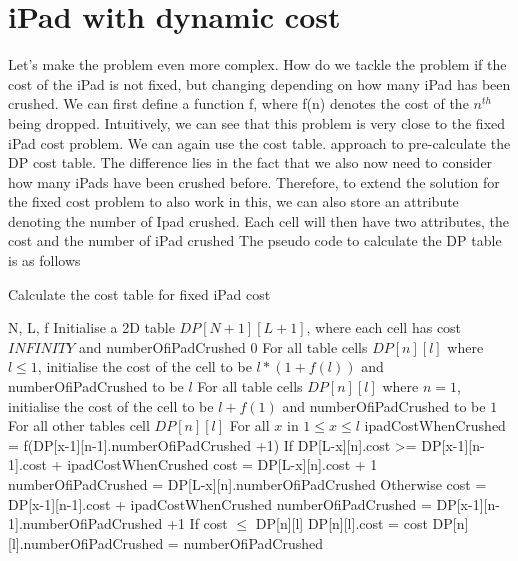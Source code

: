 \documentclass[12pt,a4paper,oneside]{report}
\newcommand{\INDSTATE}[1][1]{\STATE\hspace{#1\algorithmicindent}}
\begin{document}
\section{iPad with dynamic cost}
Let's make the problem even more complex. How do we tackle the problem if the cost of the iPad is not fixed, but changing depending on how many iPad has been crushed. 
We can first define a function f, where f(n) denotes the cost of the $n^{th}$ being dropped.
Intuitively, we can see that this problem is very close to the fixed iPad cost problem. We can again use the cost table. approach to pre-calculate the DP cost table. The difference lies in the fact that we also now need to consider how many iPads have been crushed before.
Therefore, to extend the solution for the fixed cost problem to also work in this, we can also store an attribute denoting the number of Ipad crushed. Each cell will then have two attributes, the cost and the number of iPad crushed
The pseudo code to calculate the DP table is as follows
\begin{algorithm}
        \caption{Calculate the cost table for fixed iPad cost}
        \begin{algorithmic}[1]
            \REQUIRE N, L, f
            \STATE Initialise a 2D table $DP[N+1][L+1]$, where each cell has cost $INFINITY$ and numberOfiPadCrushed  $0$
            \STATE For all table cells $DP[n][l]$ where $l \leq 1$, initialise the cost of the cell to be $l*(1 + f(l))$ and numberOfiPadCrushed  to be $l$
            \STATE For all table cells $DP[n][l]$ where $n = 1$, initialise the cost of the cell to be $l+f(1)$ and numberOfiPadCrushed to be $1$
            \STATE For all other tables cell $DP[n][l]$
            \INDSTATE For all $x$ in $1 \leq x \leq l$
            \INDSTATE[2] ipadCostWhenCrushed = f(DP[x-1][n-1].numberOfiPadCrushed +1)
            \INDSTATE[2] If DP[L-x][n].cost >= DP[x-1][n-1].cost + ipadCostWhenCrushed
            \INDSTATE[3] cost = DP[L-x][n].cost + 1
            \INDSTATE[3] numberOfiPadCrushed = DP[L-x][n].numberOfiPadCrushed
            \INDSTATE[2] Otherwise
            \INDSTATE[3] cost = DP[x-1][n-1].cost + ipadCostWhenCrushed
            \INDSTATE[3] numberOfiPadCrushed = DP[x-1][n-1].numberOfiPadCrushed +1
            \INDSTATE[2] If cost $\leq$ DP[n][l]
            \INDSTATE[3] DP[n][l].cost = cost
            \INDSTATE[3] DP[n][l].numberOfiPadCrushed = numberOfiPadCrushed

        \end{algorithmic}
\end{algorithm}
\end{document}
